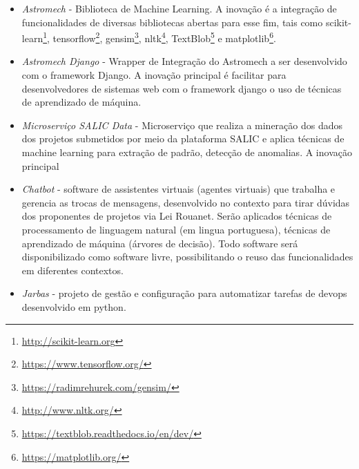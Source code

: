 \begin{itemize}
\begin{itemize}
  
   \item \textit{Astromech} - Biblioteca de Machine Learning. A inovação é a integração de  funcionalidades de diversas bibliotecas
  abertas para esse fim, tais como scikit-learn\footnote{\url{ http://scikit-learn.org}}, tensorflow\footnote{\url{https://www.tensorflow.org/}}, 
  gensim\footnote{\url{https://radimrehurek.com/gensim/}}, nltk\footnote{\url{http://www.nltk.org/}}, 
  TextBlob\footnote{\url{https://textblob.readthedocs.io/en/dev/}} e matplotlib\footnote{\url{ https://matplotlib.org/}}.
  
  \item \textit{Astromech Django} - Wrapper de Integração do Astromech a ser desenvolvido com o framework Django.  A inovação principal é facilitar 
  para desenvolvedores de sistemas web com o framework django o uso de técnicas de aprendizado de máquina.
  
  \item \textit{Microserviço SALIC Data} - Microserviço que realiza a mineração dos dados dos projetos submetidos por meio da plataforma SALIC 
  e aplica técnicas de machine learning para extração de padrão, detecção de anomalias. A inovação principal 
  
  \item \textit{Chatbot} - software de assistentes virtuais (agentes virtuais) que trabalha e gerencia as trocas de mensagens, desenvolvido
  no contexto para tirar dúvidas dos proponentes de projetos via Lei Rouanet. Serão aplicados técnicas de processamento de linguagem natural (em
  lingua portuguesa), técnicas de aprendizado de máquina (árvores de decisão). Todo software será disponibilizado como software livre, 
  possibilitando o reuso das funcionalidades em diferentes contextos.
  
  \item \textit{Jarbas} - projeto de gestão e configuração para automatizar tarefas de devops desenvolvido em python. 
 \end{itemize}

\end{itemize}


% 
% 
% 
% 


